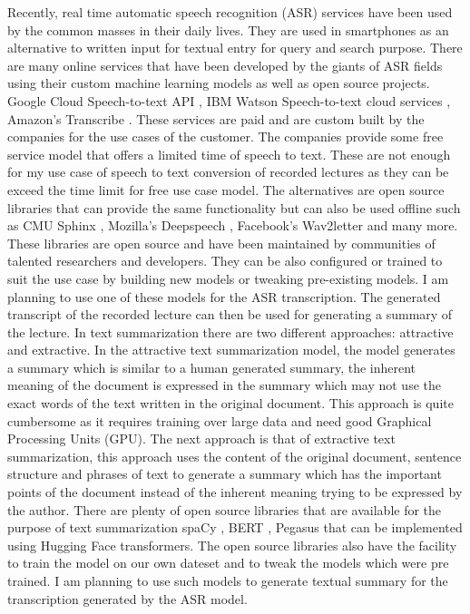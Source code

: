\documentclass[11pt,a4paper]{article}
\begin{document}
	Recently, real time automatic speech recognition (ASR) services have been used by the common masses in their daily lives. They are used in smartphones as an alternative to written input for textual entry for query and search purpose.  There are many online services that have been developed by the giants of ASR fields using their custom machine learning models as well as open source projects. Google Cloud Speech-to-text API \citep{google-speech-to-text}, IBM Watson Speech-to-text cloud services \citep{ibmWatsonOverview}, Amazon's Transcribe \citep{amazontranscribe}. These services are paid and are custom built by the companies for the use cases of the customer. The companies provide some free service model that offers a limited time of speech to text. These are not enough for my use case of speech to text conversion of recorded lectures as they can be exceed the time limit for free use case model. The alternatives are open source libraries that can provide the same functionality but can also be used offline such as CMU Sphinx \citep{cmu-sphinx}, Mozilla's Deepspeech \citep{deepspeech-mozilla}, Facebook's Wav2letter \citep{wav2letter} and many more. These libraries are open source and have been maintained by communities of talented researchers and developers. They can be also configured or trained to suit the use case by building new models or tweaking pre-existing models. I am planning to use one of these models for the ASR transcription. The generated transcript of the recorded lecture can then be used for generating a summary of the lecture. In text summarization there are two different approaches: attractive and  extractive. In the attractive text summarization model, the model generates a summary which is similar to a human generated summary, the inherent meaning of the document is expressed in the summary which may not use the exact words of the text written in the original document. This approach is quite cumbersome as it requires training over large data and need good Graphical Processing Units (GPU). The next approach is that of extractive text summarization, this approach uses the content of the original document, sentence structure and phrases of text to generate a summary which has the important points of the document instead of the inherent meaning trying to be expressed by the author. There are plenty of open source libraries that are available for the purpose of text summarization spaCy \citep{spacy}, BERT \citep{devlin2018bert}, Pegasus \citep{zhang2020pegasus} that can be implemented using Hugging Face \citep{huggingface} transformers. The open source libraries also have the facility to train the model on our own dateset and to tweak the models which were pre trained. I am planning to use such models to generate textual summary for the transcription generated by the ASR model.
	
\end{document}
